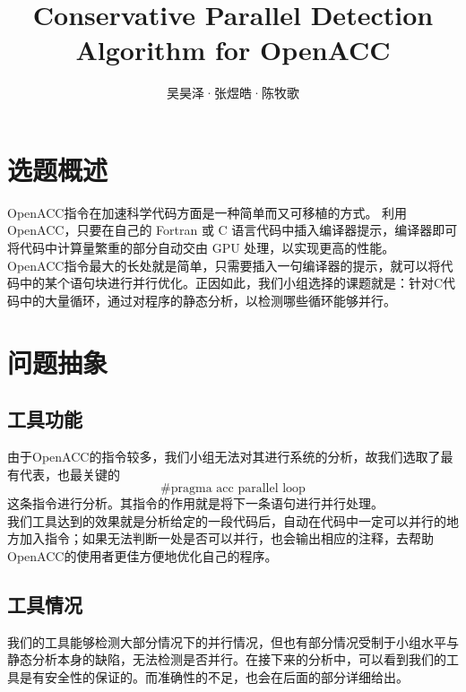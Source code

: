 \documentclass[12pt]{article}
\title{Conservative Parallel Detection Algorithm for OpenACC}
\author{吴昊泽·张煜皓·陈牧歌}
\begin{document}
	\maketitle
	\section{选题概述} 
		OpenACC指令在加速科学代码方面是一种简单而又可移植的方式。 利用 OpenACC，只要在自己的 Fortran 或 C 语言代码中插入编译器提示，编译器即可将代码中计算量繁重的部分自动交由 GPU 处理，以实现更高的性能。\\
		\indent OpenACC指令最大的长处就是简单，只需要插入一句编译器的提示，就可以将代码中的某个语句块进行并行优化。正因如此，我们小组选择的课题就是：针对C代码中的大量循环，通过对程序的静态分析，以检测哪些循环能够并行。\\
	\section{问题抽象}
		\subsection{工具功能}
			由于OpenACC的指令较多，我们小组无法对其进行系统的分析，故我们选取了最有代表，也最关键的\[\text{\#pragma acc parallel loop}\]这条指令进行分析。其指令的作用就是将下一条语句进行并行处理。\\
			\indent 我们工具达到的效果就是分析给定的一段代码后，自动在代码中一定可以并行的地方加入指令；如果无法判断一处是否可以并行，也会输出相应的注释，去帮助OpenACC的使用者更佳方便地优化自己的程序。\\
		\subsection{工具情况}
			我们的工具能够检测大部分情况下的并行情况，但也有部分情况受制于小组水平与静态分析本身的缺陷，无法检测是否并行。在接下来的分析中，可以看到我们的工具是有安全性的保证的。而准确性的不足，也会在后面的部分详细给出。
\end{document}

